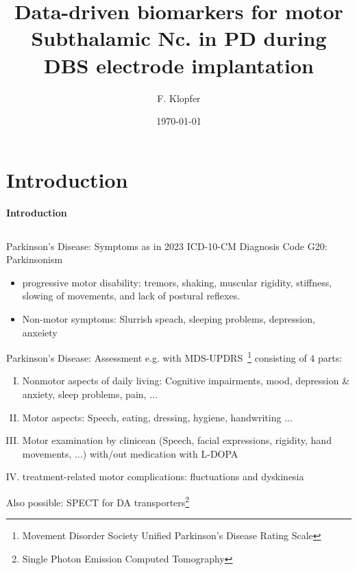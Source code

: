 \documentclass[10pt]{beamer}
\title{\textbf{Data-driven biomarkers for motor Subthalamic Nc. in PD during DBS electrode implantation}}
\author{\vspace{-0.7cm}F. Klopfer}
\date{\today}
\begin{document}
\frame{\titlepage}

\section{Introduction}
\begin{frame}
\begin{center}
 \begin{Huge}
  \textbf{Introduction}
 \end{Huge}
 \end{center}
\end{frame}
\subsection{}
\begin{frame}[fragile]{Parkinson's Disease: Symptoms}
  as in 2023 ICD-10-CM Diagnosis Code G20: Parkinsonism~\autocite{who} \\ [2em]
    \begin{itemize}
     \item progressive motor disability: tremors, shaking, muscular rigidity, stiffness, slowing of movements, and lack of postural reflexes. \\ [2em]
     \item Non-motor symptoms: Slurrish speach, sleeping problems, depression, anxeiety
    \end{itemize}
     \framebreak
     \end{frame}


\begin{frame}[fragile]{Parkinson's Disease: Assessment}
     e.g. with MDS-UPDRS~\autocite{mdsupdrs}\footnote[frame]{Movement Disorder Society Unified Parkinson's Disease Rating Scale} consisting of 4 parts:
      \begin{enumerate}[I.]
        \item Nonmotor aspects of daily living: Cognitive impairments, mood, depression \& anxiety, sleep problems, pain, $\dots$
        \item Motor aspects: Speech, eating, dressing, hygiene, handwriting $\dots$
        \item Motor examination by clinicean (Speech, facial expressions, rigidity, hand movements, $\dots$) with/out medication with L-DOPA
        \item treatment-related motor complications: fluctuations and dyskinesia \\ [2em]
      \end{enumerate}
      Also possible: SPECT for DA transporters\footnote[frame]{Single Photon Emission Computed Tomography}
    \end{frame}
\end{document}
